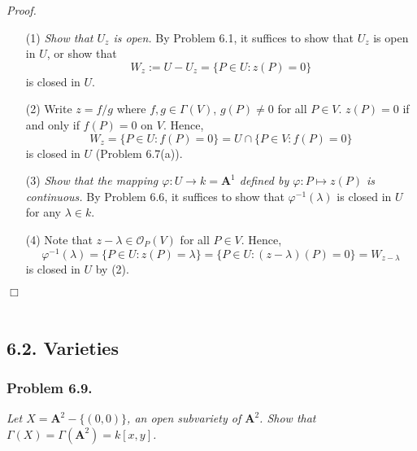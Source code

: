 \documentclass{article}
\begin{document}
\emph{Proof.}
\begin{enumerate}
\item[(1)]
  \emph{Show that $U_z$ is open.}
  By Problem 6.1, it suffices to show that $U_z$ is open in $U$,
  or show that
  \[
    W_z := U - U_z = \{ P \in U : z(P) = 0 \}
  \]
  is closed in $U$.

\item[(2)]
  Write $z = f/g$ where $f, g \in \Gamma(V)$, $g(P) \neq 0$ for all $P \in V$.
  $z(P) = 0$ if and only if $f(P) = 0$ on $V$.
  Hence,
  \[
    W_z
    = \{ P \in U : f(P) = 0 \}
    = U \cap \{ P \in V : f(P) = 0 \}
  \]
  is closed in $U$ (Problem 6.7(a)).

\item[(3)]
  \emph{Show that the mapping $\varphi: U \to k = \mathbf{A}^{1}$ defined by
  $\varphi: P \mapsto z(P)$ is continuous.}
  By Problem 6.6,
  it suffices to show that $\varphi^{-1}(\lambda)$ is closed in $U$ for any $\lambda \in k$.

\item[(4)]
  Note that $z - \lambda \in \mathscr{O}_P(V)$ for all $P \in V$.
  Hence,
  \[
    \varphi^{-1}(\lambda)
    = \{ P \in U : z(P) = \lambda \}
    = \{ P \in U : (z-\lambda)(P) = 0 \}
    = W_{z-\lambda}
  \]
  is closed in $U$ by (2).
\end{enumerate}
$\Box$ \\\\






\subsection*{6.2. Varieties \\}



\subsubsection*{Problem 6.9.}
\emph{Let $X = \mathbf{A}^{2} - \{(0,0)\}$,
an open subvariety of $\mathbf{A}^{2}$.
Show that $\Gamma(X) = \Gamma(\mathbf{A}^{2}) = k[x,y]$.} \\
\end{document}

